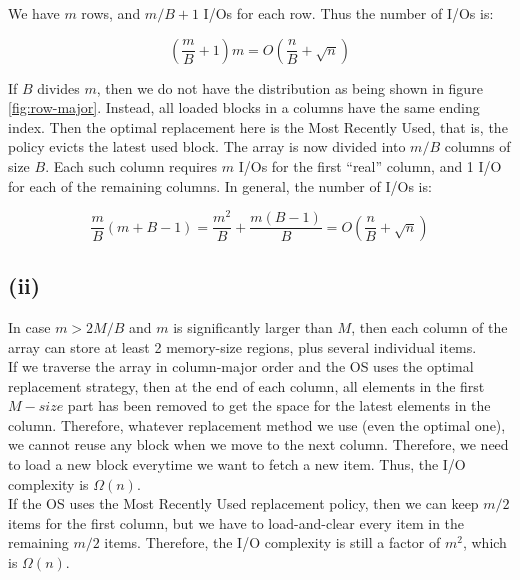 We have $m$ rows, and $m/B + 1$ I/Os for each row. Thus the number of I/Os is:

 $$(\frac{m}{B} + 1)m = O(\frac{n}{B} + \sqrt{n})$$

If $B$ divides $m$, then we do not have the distribution as being shown in figure \ref{fig:row-major}. Instead, all loaded blocks in a columns have the same ending index. Then the optimal replacement here is the Most Recently Used, that is, the policy evicts the latest used block. The array is now divided into $m / B$ columns of size $B$. Each such column requires $m$ I/Os for the first ``real'' column, and 1 I/O for each of the remaining columns. In general, the number of I/Os is:

$$\frac{m}{B}(m + B - 1) = \frac{m^2}{B} + \frac{m(B - 1)}{B} = O(\frac{n}{B} + \sqrt{n})$$

\subsection*{(ii)}
In case $m > 2M/B$ and $m$ is significantly larger than $M$, then each column of the array can store at least 2 memory-size regions, plus several individual items. \\

If we traverse the array in column-major order and the OS uses the optimal replacement strategy, then at the end of each column, all elements in the first $M-size$ part has been removed to get the space for the latest elements in the column. Therefore, whatever replacement method we use (even the optimal one), we cannot reuse any block when we move to the next column. Therefore, we need to load a new block everytime we want to fetch a new item. Thus, the I/O complexity is $\Omega(n)$.\\

If the OS uses the Most Recently Used replacement policy, then we can keep $m/2$ items for the first column, but we have to load-and-clear every item in the remaining $m/2$ items. Therefore, the I/O complexity is still a factor of $m^2$, which is $\Omega(n)$.
